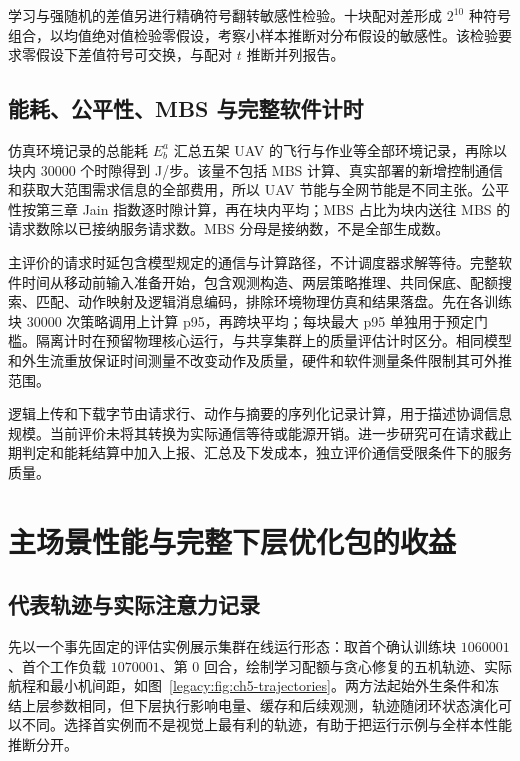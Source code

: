 学习与强随机的差值另进行精确符号翻转敏感性检验。十块配对差形成 $2^{10}$ 种符号组合，以均值绝对值检验零假设，考察小样本推断对分布假设的敏感性。该检验要求零假设下差值符号可交换，与配对 $t$ 推断并列报告。

\subsection{能耗、公平性、MBS 与完整软件计时}

仿真环境记录的总能耗 $E_b^a$ 汇总五架 UAV 的飞行与作业等全部环境记录，再除以块内 $30000$ 个时隙得到 J/步。该量不包括 MBS 计算、真实部署的新增控制通信和获取大范围需求信息的全部费用，所以 UAV 节能与全网节能是不同主张。公平性按第三章 Jain 指数逐时隙计算，再在块内平均；MBS 占比为块内送往 MBS 的请求数除以已接纳服务请求数。MBS 分母是接纳数，不是全部生成数。

主评价的请求时延包含模型规定的通信与计算路径，不计调度器求解等待。完整软件时间从移动前输入准备开始，包含观测构造、两层策略推理、共同保底、配额搜索、匹配、动作映射及逻辑消息编码，排除环境物理仿真和结果落盘。先在各训练块 $30000$ 次策略调用上计算 p95，再跨块平均；每块最大 p95 单独用于预定门槛。隔离计时在预留物理核心运行，与共享集群上的质量评估计时区分。相同模型和外生流重放保证时间测量不改变动作及质量，硬件和软件测量条件限制其可外推范围。

逻辑上传和下载字节由请求行、动作与摘要的序列化记录计算，用于描述协调信息规模。当前评价未将其转换为实际通信等待或能源开销。进一步研究可在请求截止期判定和能耗结算中加入上报、汇总及下发成本，独立评价通信受限条件下的服务质量。

\section{主场景性能与完整下层优化包的收益}
\label{legacy:sec:whole-results}
\label{legacy:sec:ch5-results}

\subsection{代表轨迹与实际注意力记录}

先以一个事先固定的评估实例展示集群在线运行形态：取首个确认训练块 $1060001$、首个工作负载 $1070001$、第 $0$ 回合，绘制学习配额与贪心修复的五机轨迹、实际航程和最小机间距，如图~\ref{legacy:fig:ch5-trajectories}。两方法起始外生条件和冻结上层参数相同，但下层执行影响电量、缓存和后续观测，轨迹随闭环状态演化可以不同。选择首实例而不是视觉上最有利的轨迹，有助于把运行示例与全样本性能推断分开。

